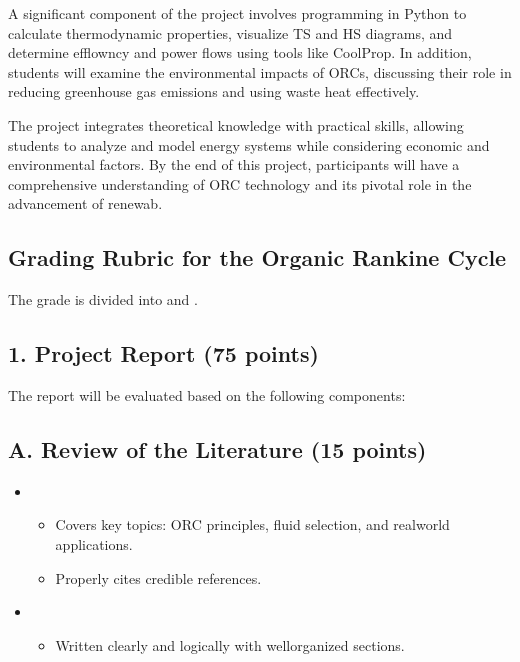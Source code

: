 \documentclass[letterpaper,10pt,english]{jupyterBook}
\begin{document}
\sphinxAtStartPar
A significant component of the project involves programming in Python to
calculate thermodynamic properties, visualize T\sphinxhyphen{}S and H\sphinxhyphen{}S diagrams, and
determine efflowncy and power flows using tools like CoolProp. In
addition, students will examine the environmental impacts of ORCs,
discussing their role in reducing greenhouse gas emissions and using
waste heat effectively.

\sphinxAtStartPar
The project integrates theoretical knowledge with practical skills,
allowing students to analyze and model energy systems while considering
economic and environmental factors. By the end of this project,
participants will have a comprehensive understanding of ORC technology
and its pivotal role in the advancement of renewab.


\subsection{Grading Rubric for the Organic Rankine Cycle}
\label{\detokenize{ProjectSyllabus:grading-rubric-for-the-organic-rankine-cycle}}
\sphinxAtStartPar
{}

\sphinxAtStartPar
The grade is divided into  and .


\subsection{1. Project Report (75 points)}
\label{\detokenize{ProjectSyllabus:id1}}
\sphinxAtStartPar
The report will be evaluated based on the following components:


\subsection{A. Review of the Literature (15 points)}
\label{\detokenize{ProjectSyllabus:id2}}\begin{itemize}
\item {} 
\sphinxAtStartPar
{}
\begin{itemize}
\item {} 
\sphinxAtStartPar
Covers key topics: ORC principles, fluid selection, and real\sphinxhyphen{}world applications.

\item {} 
\sphinxAtStartPar
Properly cites credible references.

\end{itemize}

\item {} 
\sphinxAtStartPar
{}
\begin{itemize}
\item {} 
\sphinxAtStartPar
Written clearly and logically with well\sphinxhyphen{}organized sections.

\end{itemize}

\end{itemize}
\end{document}
